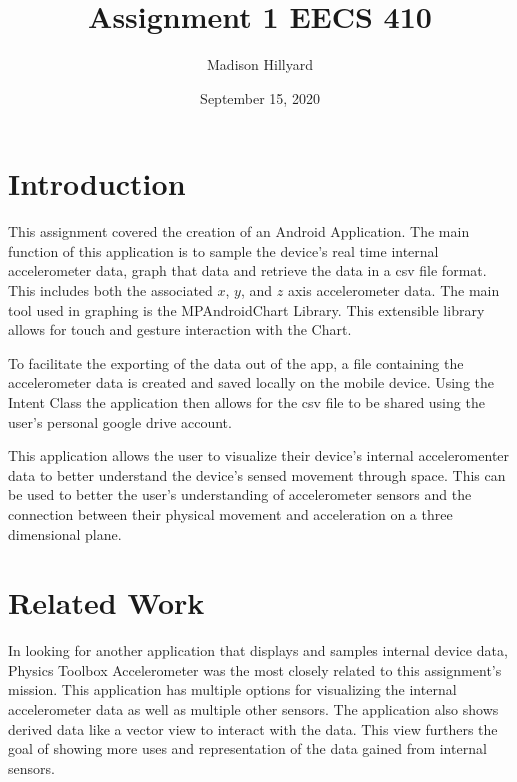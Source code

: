 \documentclass{article}
\title{Assignment 1 EECS 410}
\author{Madison Hillyard }
\date{September 15, 2020}
\begin{document}
\maketitle

\section{Introduction}
This assignment covered the creation of an Android Application. The main function of this application is to sample the device's real time internal accelerometer data, graph that data and retrieve the data in a csv file format. This includes both the associated $x$, $y$, and $z$ axis accelerometer data. The main tool used in graphing is the MPAndroidChart Library. \citep{MPACDocs} This extensible library allows for touch and gesture interaction with the Chart. 

To facilitate the exporting of the data out of the app, a file containing the accelerometer data is created and saved locally on the mobile device. Using the Intent Class the application then allows for the csv file to be shared using the user's personal google drive account. 

This application allows the user to visualize their device's internal acceleromenter data to better understand the device's sensed movement through space. This can be used to better the user's understanding of accelerometer sensors and the connection between their physical movement and acceleration on a three dimensional plane.

\section{Related Work}
In looking for another application that displays and samples internal device data, Physics Toolbox Accelerometer was the most closely related to this assignment's mission. This application has multiple options for visualizing the internal accelerometer data as well as multiple other sensors. The application also shows derived data like a vector view to interact with the data. This view furthers the goal of showing more uses and representation of the data gained from internal sensors.\citep{PhyToolBox}
\end{document}
